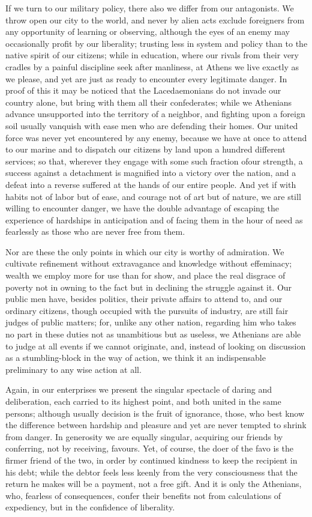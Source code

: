 \documentclass[a4paper]{amsbook}
\begin{document}
If we turn to our military policy, there also we differ from our antagonists. We throw open our city to the world, and never by alien acts exclude foreigners from any opportunity of learning or observing, although the eyes of an enemy may occasionally profit by our liberality; trusting less in system and policy than to the native spirit of our citizens; while in education, where our rivals from their very cradles by a painful discipline seek after manliness, at Athens we live exactly as we please, and yet are just as ready to encounter every legitimate danger. In proof of this it may be noticed that the Lacedaemonians do not invade our country alone, but bring with them all their confederates; while we Athenians advance unsupported into the territory of a neighbor, and fighting upon a foreign soil usually vanquish with ease men who are defending their homes. Our united force was never yet encountered by any enemy, because we have at once to attend to our marine and to dispatch our citizens by land upon a hundred different services; so that, wherever they engage with some such fraction ofour strength, a success against a detachment is magnified into a victory over the nation, and a defeat into a reverse suffered at the hands of our entire people. And yet if with habits not of labor but of ease, and courage not of art but of nature, we are still willing to encounter danger, we have the double advantage of escaping the experience of hardships in anticipation and of facing them in the hour of need as fearlessly as those who are never free from them.

Nor are these the only points in which our city is worthy of admiration. We cultivate refinement without extravagance and knowledge without effeminacy; wealth we employ more for use than for show, and place the real disgrace of poverty not in owning to the fact but in declining the struggle against it. Our public men have, besides politics, their private affairs to attend to, and our ordinary citizens, though occupied with the pursuits of industry, are still fair judges of public matters; for, unlike any other nation, regarding him who takes no part in these duties not as unambitious but as useless, we Athenians are able to judge at all events if we cannot originate, and, instead of looking on discussion as a stumbling-block in the way of action, we think it an indispensable preliminary to any wise action at all.

Again, in our enterprises we present the singular spectacle of daring and deliberation, each carried to its highest point, and both united in the same persons; although usually decision is the fruit of ignorance, those, who best know the difference between hardship and pleasure and yet are never tempted to shrink from danger. In generosity we are equally singular, acquiring our friends by conferring, not by receiving, favours. Yet, of course, the doer of the favo is the firmer friend of the two, in order by continued kindness to keep the recipient in his debt; while the debtor feels less keenly from the very consciousness that the return he makes will be a payment, not a free gift. And it is only the Athenians, who, fearless of consequences, confer their benefits not from calculations of expediency, but in the confidence of liberality.
\end{document}
